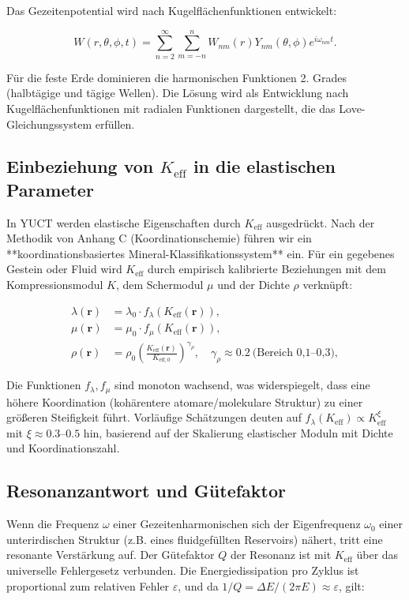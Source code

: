 \documentclass[12pt,a4paper]{article}
\theoremstyle{remark}
\newcommand{\Keff}{K_{\mathrm{eff}}}
\newcommand{\Keffzero}{K_{\mathrm{eff},0}}
\newcommand{\eps}{\varepsilon}
\begin{document}
	Das Gezeitenpotential wird nach Kugelflächenfunktionen entwickelt:
	
	\begin{equation}
		W(r,\theta,\phi,t) = \sum_{n=2}^{\infty} \sum_{m=-n}^{n} W_{nm}(r) Y_{nm}(\theta,\phi) e^{i\omega_{nm}t}.
		\label{eq:tidal-potential}
	\end{equation}
	
	Für die feste Erde dominieren die harmonischen Funktionen 2. Grades (halbtägige und tägige Wellen). Die Lösung wird als Entwicklung nach Kugelflächenfunktionen mit radialen Funktionen dargestellt, die das Love-Gleichungssystem erfüllen.
	
	\subsection{Einbeziehung von $\Keff$ in die elastischen Parameter}
	
	In YUCT werden elastische Eigenschaften durch $\Keff$ ausgedrückt. Nach der Methodik von Anhang C (Koordinationschemie) führen wir ein **koordinationsbasiertes Mineral-Klassifikationssystem** ein. Für ein gegebenes Gestein oder Fluid wird $\Keff$ durch empirisch kalibrierte Beziehungen mit dem Kompressionsmodul $K$, dem Schermodul $\mu$ und der Dichte $\rho$ verknüpft:
	
	\begin{align}
		\lambda(\mathbf{r}) &= \lambda_0 \cdot f_\lambda(\Keff(\mathbf{r})), \\
		\mu(\mathbf{r}) &= \mu_0 \cdot f_\mu(\Keff(\mathbf{r})), \\
		\rho(\mathbf{r}) &= \rho_0 \left(\frac{\Keff(\mathbf{r})}{\Keffzero}\right)^{\gamma_\rho}, \quad \gamma_\rho \approx 0.2\ \text{(Bereich 0,1–0,3)},
		\label{eq:keff-properties}
	\end{align}
	
	Die Funktionen $f_\lambda, f_\mu$ sind monoton wachsend, was widerspiegelt, dass eine höhere Koordination (kohärentere atomare/molekulare Struktur) zu einer größeren Steifigkeit führt. Vorläufige Schätzungen deuten auf $f_\lambda(\Keff) \propto \Keff^{\xi}$ mit $\xi \approx 0.3$–$0.5$ hin, basierend auf der Skalierung elastischer Moduln mit Dichte und Koordinationszahl.
	
	\subsection{Resonanzantwort und Gütefaktor}
	
	Wenn die Frequenz $\omega$ einer Gezeitenharmonischen sich der Eigenfrequenz $\omega_0$ einer unterirdischen Struktur (z.B. eines fluidgefüllten Reservoirs) nähert, tritt eine resonante Verstärkung auf. Der Gütefaktor $Q$ der Resonanz ist mit $\Keff$ über das universelle Fehlergesetz verbunden. Die Energiedissipation pro Zyklus ist proportional zum relativen Fehler $\eps$, und da $1/Q = \Delta E / (2\pi E) \approx \eps$, gilt:
	
\end{document}
